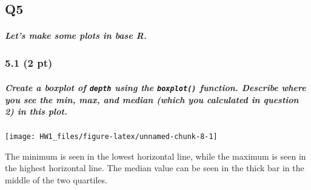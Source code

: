 \documentclass[
]{article}
\newenvironment{Shaded}{\begin{snugshade}}{\end{snugshade}}
\newcommand{\CommentTok}[1]{\textcolor[rgb]{0.56,0.35,0.01}{\textit{#1}}}
\newcommand{\ConstantTok}[1]{\textcolor[rgb]{0.00,0.00,0.00}{#1}}
\newcommand{\FunctionTok}[1]{\textcolor[rgb]{0.00,0.00,0.00}{#1}}
\newcommand{\NormalTok}[1]{#1}
\newcommand{\OtherTok}[1]{\textcolor[rgb]{0.56,0.35,0.01}{#1}}
\newcommand{\SpecialCharTok}[1]{\textcolor[rgb]{0.00,0.00,0.00}{#1}}
\begin{document}
\begin{Shaded}
\end{Shaded}

\hypertarget{q5}{%
\subsection{Q5}\label{q5}}

\hypertarget{lets-make-some-plots-in-base-r.}{%
\subparagraph{Let's make some plots in base
R.}\label{lets-make-some-plots-in-base-r.}}

\hypertarget{pt-1}{%
\subsubsection{5.1 (2 pt)}\label{pt-1}}

\hypertarget{create-a-boxplot-of-depth-using-the-boxplot-function.-describe-where-you-see-the-min-max-and-median-which-you-calculated-in-question-2-in-this-plot.}{%
\subparagraph{\texorpdfstring{Create a boxplot of \texttt{depth} using
the \texttt{boxplot()} function. Describe where you see the min, max,
and median (which you calculated in question 2) in this
plot.}{Create a boxplot of depth using the boxplot() function. Describe where you see the min, max, and median (which you calculated in question 2) in this plot.}}\label{create-a-boxplot-of-depth-using-the-boxplot-function.-describe-where-you-see-the-min-max-and-median-which-you-calculated-in-question-2-in-this-plot.}}

\begin{Shaded}
\end{Shaded}

\begin{center}\texttt{[image: HW1\_files/figure-latex/unnamed-chunk-8-1]} \end{center}

The minimum is seen in the lowest horizontal line, while the maximum is
seen in the highest horizontal line. The median value can be seen in the
thick bar in the middle of the two quartiles.
\end{document}
